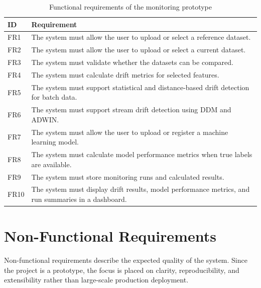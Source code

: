 \begin{table}[h]
\centering
\begin{tabular}{p{} p{}}
\hline
\textbf{ID} & \textbf{Requirement} \\
\hline
FR1 & The system must allow the user to upload or select a reference dataset. \\
FR2 & The system must allow the user to upload or select a current dataset. \\
FR3 & The system must validate whether the datasets can be compared. \\
FR4 & The system must calculate drift metrics for selected features. \\
FR5 & The system must support statistical and distance-based drift detection for batch data. \\
FR6 & The system must support stream drift detection using DDM and ADWIN. \\
FR7 & The system must allow the user to upload or register a machine learning model. \\
FR8 & The system must calculate model performance metrics when true labels are available. \\
FR9 & The system must store monitoring runs and calculated results. \\
FR10 & The system must display drift results, model performance metrics, and run summaries in a dashboard. \\
\hline
\end{tabular}
\caption{Functional requirements of the monitoring prototype}
\label{tab:functional-requirements}
\end{table}

\section{Non-Functional Requirements}

Non-functional requirements describe the expected quality of the system. Since the project is a prototype, the focus is placed on clarity, reproducibility, and extensibility rather than large-scale production deployment.

